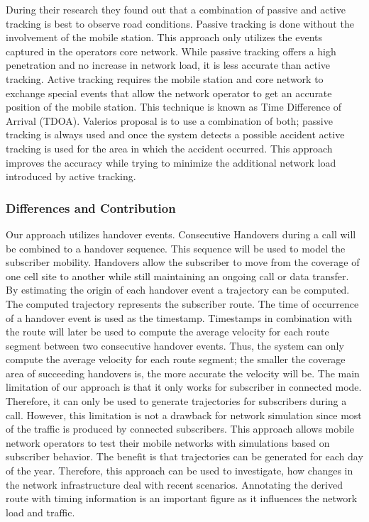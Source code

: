 During their research they found out that a combination of passive and active tracking is best to observe road conditions. Passive tracking is done without the involvement of the mobile station. This approach only utilizes the events captured in the operators core network. While passive tracking offers a high penetration and no increase in network load, it is less accurate than active tracking. Active tracking requires the mobile station and core network to exchange special events that allow the network operator to get an accurate position of the mobile station. This technique is known as Time Difference of Arrival (TDOA). Valerios proposal is to use a combination of both; passive tracking is always used and once the system detects a possible accident active tracking is used for the area in which the accident occurred. This approach improves the accuracy while trying to minimize the additional network load introduced by active tracking.


\subsubsection{Differences and Contribution}
Our approach utilizes handover events. Consecutive Handovers during a call will be combined to a handover sequence. This sequence will be used to model the subscriber mobility. Handovers allow the subscriber to move from the coverage of one cell site to another while still maintaining an ongoing call or data transfer. By estimating the origin of each handover event a trajectory can be computed. The computed trajectory represents the subscriber route. The time of occurrence of a handover event is used as the timestamp. Timestamps in combination with the route will later be used to compute the average velocity for each route segment between two consecutive handover events. Thus, the system can only compute the average velocity for each route segment; the smaller the coverage area of succeeding handovers is, the more accurate the velocity will be. The main limitation of our approach is that it only works for subscriber in connected mode. Therefore, it can only be used to generate trajectories for subscribers during a call. However, this limitation is not a drawback for network simulation since most of the traffic is produced by connected subscribers.
This approach allows mobile network operators to test their mobile networks with simulations based on subscriber behavior. The benefit is that trajectories can be generated for each day of the year. Therefore, this approach can be used to investigate, how changes in the network infrastructure deal with recent scenarios. Annotating the derived route with timing information is an important figure as it influences the network load and traffic. 
